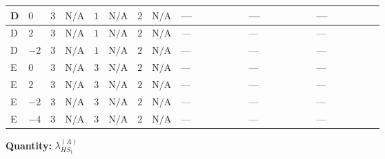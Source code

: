\documentclass[8pt]{article}
\begin{document}
\begin{landscape}
\begin{longtable}{@{}llcccccc >{\raggedright\arraybackslash}p{0.21\linewidth} >{\raggedright\arraybackslash}p{0.21\linewidth} >{\raggedright\arraybackslash}p{0.21\linewidth}@{}}
\midrule
D & $0$ & $3$ & $\text{N/A}$ & $1$ & $\text{N/A}$ & $2$ & $\text{N/A}$ & --- & --- & --- \\
\midrule
D & $2$ & $3$ & $\text{N/A}$ & $1$ & $\text{N/A}$ & $2$ & $\text{N/A}$ & --- & --- & --- \\
\midrule
D & $-2$ & $3$ & $\text{N/A}$ & $1$ & $\text{N/A}$ & $2$ & $\text{N/A}$ & --- & --- & --- \\
\midrule
E & $0$ & $3$ & $\text{N/A}$ & $3$ & $\text{N/A}$ & $2$ & $\text{N/A}$ & --- & --- & --- \\
\midrule
E & $2$ & $3$ & $\text{N/A}$ & $3$ & $\text{N/A}$ & $2$ & $\text{N/A}$ & --- & --- & --- \\
\midrule
E & $-2$ & $3$ & $\text{N/A}$ & $3$ & $\text{N/A}$ & $2$ & $\text{N/A}$ & --- & --- & --- \\
\midrule
E & $-4$ & $3$ & $\text{N/A}$ & $3$ & $\text{N/A}$ & $2$ & $\text{N/A}$ & --- & --- & --- \\
\midrule
\bottomrule
\end{longtable}
\clearpage
\noindent\textbf{Quantity: }$\lambda_{HS_1}^{(A)}$\par\smallskip

\end{landscape}
\end{document}
